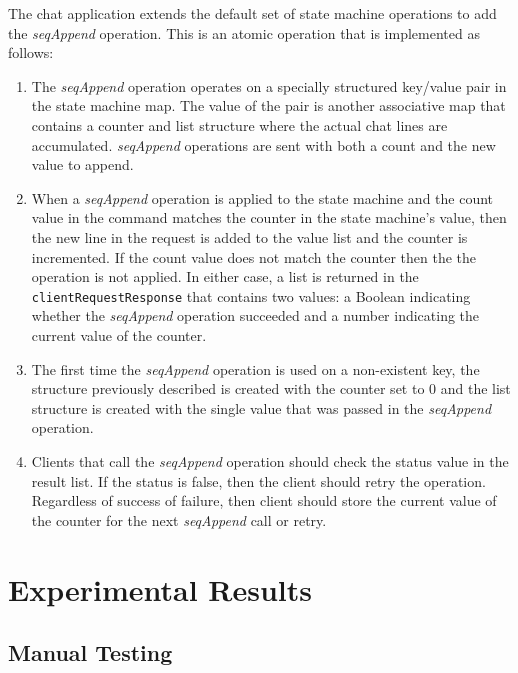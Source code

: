 \documentclass[conference,compsoc]{./IEEEtran/IEEEtran}
\begin{document}

The chat application extends the default set of state machine
operations to add the \emph{seqAppend} operation. This is an atomic
operation that is implemented as follows:

\begin{enumerate}
\item The \emph{seqAppend} operation operates on a specially
    structured key/value pair in the state machine map. The value of
    the pair is another associative map that contains a counter and
    list structure where the actual chat lines are accumulated.
    \emph{seqAppend} operations are sent with both a count and the new
    value to append.
\item When a \emph{seqAppend} operation is applied to the state
    machine and the count value in the command matches the counter in
    the state machine's value, then the new line in the request is
    added to the value list and the counter is incremented. If the
    count value does not match the counter then the the operation is
    not applied. In either case, a list is returned in the
    \texttt{clientRequestResponse} that contains two values: a Boolean
    indicating whether the \emph{seqAppend} operation succeeded and
    a number indicating the current value of the counter.
\item The first time the \emph{seqAppend} operation is used on
    a non-existent key, the structure previously described is created
    with the counter set to 0 and the list structure is created with
    the single value that was passed in the \emph{seqAppend}
    operation.
\item Clients that call the \emph{seqAppend} operation should check
    the status value in the result list. If the status is false, then
    the client should retry the operation. Regardless of success of
    failure, then client should store the current value of the counter
    for the next \emph{seqAppend} call or retry.
\end{enumerate}

\section{Experimental Results}


\ifdefined\OPTIONAL

\subsection{Manual Testing}
\end{document}
